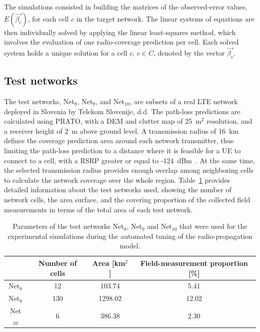 The simulations consisted in building the matrices of the observed-error
values, $E(\vec{\beta_{c}})$, for each cell $c$ in the target network.
The linear systems of equations are then individually solved by applying
the linear least-squares method, which involves the evaluation of
one radio-coverage prediction per cell. Each solved system holds a
unique solution for a cell $c$, $c\in C$, denoted by the vector
$\vec{\beta_{c}}$.


\subsection{Test networks \label{sub:05-Test_networks}}

The test networks, Net$_{8}$, Net$_{9}$, and Net$_{10}$, are subsets
of a real LTE network deployed in Slovenia by Telekom Slovenije, d.d.
The path-loss predictions are calculated using PRATO, with a DEM and
clutter map of 25~m$^{2}$ resolution, and a receiver height of 2~m
above ground level. A transmission radius of 16~km defines the coverage
prediction area around each network transmitter, thus limiting the
path-loss prediction to a distance where it is feasible for a UE to
connect to a cell, with a RSRP greater or equal to -124~dBm~\cite{Neuland_Influence_of_Different_Factors_on_X_Map_Estimation_in_LTE:2011}.
At the same time, the selected transmission radius provides enough
overlap among neighboring cells to calculate the network coverage
over the whole region. Table~\ref{tab:05-Test_network_properties}
provides detailed information about the test networks used, showing
the number of network cells, the area surface, and the covering proportion
of the collected field measurements in terms of the total area of
each test network.

\begin{table}
\centering

\caption{Parameters of the test networks Net$_{8}$, Net$_{9}$ and Net$_{10}$
that were used for the experimental simulations during the automated
tuning of the radio-propagation model.\label{tab:05-Test_network_properties}}


\begin{tabular}{cccc}
\cline{2-4} 
 & Number of cells  & Area {[}km$^{2}${]} & Field-measurement proportion {[}\%{]}\tabularnewline
\hline 
Net$_{8}$  & 12 & 103.74 & 5.41\tabularnewline
Net$_{9}$  & 130  & 1298.02 & 12.02\tabularnewline
Net$_{10}$  & 6  & 386.38 & 2.30\tabularnewline
\hline 
\end{tabular}
\end{table}


